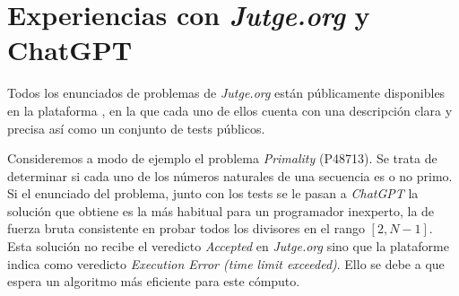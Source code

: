 \documentclass[twocolumn,twoside,a4paper, 10pt]{article}
\newcommand{\jutge}{\textit{Jutge.org}{}}           %
\newcommand{\ChatGPT}{\textit{ChatGPT}{}}           %
\begin{document}

\section{Experiencias con \textit{Jutge.org} y ChatGPT}
Todos los enunciados de problemas de \jutge{} están públicamente disponibles en la
plataforma \cite{URL::prob}, en la que cada uno de ellos cuenta con una descripción clara y precisa así como un
conjunto de tests públicos.

Consideremos a modo de ejemplo el problema \textit{Primality} (P48713).
Se trata de determinar si cada uno de los números naturales de una secuencia es o no primo.
Si el enunciado del problema, junto con los tests se le pasan a \ChatGPT{} la solución que obtiene es la más
habitual para un programador inexperto, la de fuerza bruta consistente en probar todos los divisores en el
rango $[2, N-1]$.
Esta solución no recibe el veredicto \textit{Accepted} en \jutge{} sino que la plataforme indica
como veredicto \textit{Execution Error (time limit exceeded)}.
Ello se debe a que espera un algoritmo más eficiente para este cómputo.
\end{document}
